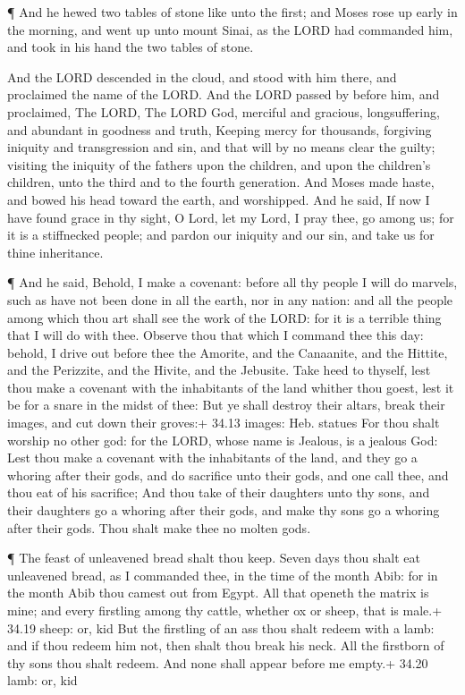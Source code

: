  ¶ And he hewed two tables of stone like unto the first; and
Moses rose up early in the morning, and went up unto mount Sinai, as the
LORD had commanded him, and took in his hand the two tables of stone.

 And the LORD descended in the cloud, and stood with him
there, and proclaimed the name of the LORD.  And the LORD
passed by before him, and proclaimed, The LORD, The LORD God, merciful
and gracious, longsuffering, and abundant in goodness and truth,
 Keeping mercy for thousands, forgiving iniquity and
transgression and sin, and that will by no means clear the guilty;
visiting the iniquity of the fathers upon the children, and upon the
children's children, unto the third and to the fourth generation.
 And Moses made haste, and bowed his head toward the earth,
and worshipped.  And he said, If now I have found grace in
thy sight, O Lord, let my Lord, I pray thee, go among us; for it is a
stiffnecked people; and pardon our iniquity and our sin, and take us for
thine inheritance.

 ¶ And he said, Behold, I make a covenant: before all thy
people I will do marvels, such as have not been done in all the earth,
nor in any nation: and all the people among which thou art shall see the
work of the LORD: for it is a terrible thing that I will do with thee.
 Observe thou that which I command thee this day: behold, I
drive out before thee the Amorite, and the Canaanite, and the Hittite,
and the Perizzite, and the Hivite, and the Jebusite.  Take
heed to thyself, lest thou make a covenant with the inhabitants of the
land whither thou goest, lest it be for a snare in the midst of thee:
 But ye shall destroy their altars, break their images, and
cut down their groves:+ 34.13 images: Heb. statues  For
thou shalt worship no other god: for the LORD, whose name is Jealous, is
a jealous God:  Lest thou make a covenant with the
inhabitants of the land, and they go a whoring after their gods, and do
sacrifice unto their gods, and one call thee, and thou eat of his
sacrifice;  And thou take of their daughters unto thy sons,
and their daughters go a whoring after their gods, and make thy sons go
a whoring after their gods.  Thou shalt make thee no molten
gods.

 ¶ The feast of unleavened bread shalt thou keep. Seven
days thou shalt eat unleavened bread, as I commanded thee, in the time
of the month Abib: for in the month Abib thou camest out from Egypt.
 All that openeth the matrix is mine; and every firstling
among thy cattle, whether ox or sheep, that is male.+ 34.19 sheep: or,
kid  But the firstling of an ass thou shalt redeem with a
lamb: and if thou redeem him not, then shalt thou break his neck. All
the firstborn of thy sons thou shalt redeem. And none shall appear
before me empty.+ 34.20 lamb: or, kid

